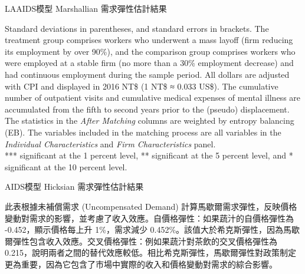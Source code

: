 \begin{table}[H]
    \caption{LAAIDS模型 Marshallian 需求彈性估計結果}
    \center
    \footnotesize
      \label{laaids_marshall}
\end{table}
\vspace{-2em}
\begin{singlespace}
    \begin{footnotesize}
     Standard deviations in parentheses, and standard errors in brackets. The treatment group comprises workers who underwent a mass layoff (firm reducing its employment by over 90\%), and the comparison group comprises workers who were employed at a stable firm (no more than a 30\% employment decrease) and had continuous employment during the sample period. All dollars are adjusted with CPI and displayed in 2016 NT\$ (1 NT\$ ≈ 0.033 US\$). The cumulative number of outpatient visits and cumulative medical expenses of mental illness are accumulated from the fifth to second years prior to the (pseudo) displacement. The statistics in the {\it After Matching} columns are weighted by entropy balancing (EB). The variables included in the matching process are all variables in the {\it Individual Characteristics} and {\it Firm Characteristics} panel. \\
    *** significant at the 1 percent level, ** significant at the 5 percent level, and * significant at the 10 percent level.
    \end{footnotesize}
\end{singlespace}

\begin{table}[H]
    \caption{AIDS模型 Hicksian 需求彈性估計結果} \label{aids_hicks}
    \center
    \footnotesize
    
\end{table}
\vspace{-2em}
\begin{singlespace}
    \begin{footnotesize}
        \raggedright
         此表根據未補償需求 (Uncompensated Demand) 計算馬歇爾需求彈性，反映價格變動對需求的影響，並考慮了收入效應。自價格彈性：如果蔬汁的自價格彈性為 -0.452，顯示價格每上升 1\%，需求減少 0.452\%。該值大於希克斯彈性，因為馬歇爾彈性包含收入效應。交叉價格彈性：例如果蔬汁對茶飲的交叉價格彈性為 0.215，說明兩者之間的替代效應較低。相比希克斯彈性，馬歇爾彈性對政策制定更為重要，因為它包含了市場中實際的收入和價格變動對需求的綜合影響。
    \end{footnotesize}
\end{singlespace}

